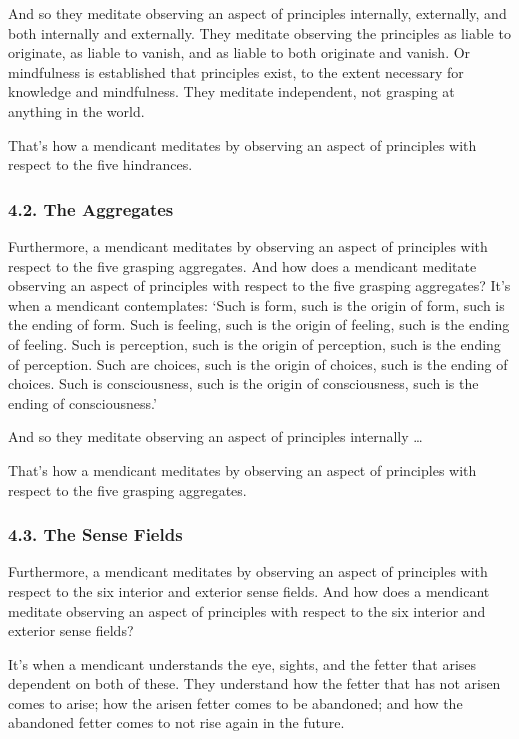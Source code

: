 \documentclass[12pt,openany]{book}%
\begin{document}
And so they meditate observing an aspect of principles internally, externally, and both internally and externally. They meditate observing the principles as liable to originate, as liable to vanish, and as liable to both originate and vanish. Or mindfulness is established that principles exist, to the extent necessary for knowledge and mindfulness. They meditate independent, not grasping at anything in the world. 

That’s how a mendicant meditates by observing an aspect of principles with respect to the five hindrances. 

\subsubsection*{4.2. The Aggregates }

Furthermore, a mendicant meditates by observing an aspect of principles with respect to the five grasping aggregates. And how does a mendicant meditate observing an aspect of principles with respect to the five grasping aggregates? It’s when a mendicant contemplates: ‘Such is form, such is the origin of form, such is the ending of form. Such is feeling, such is the origin of feeling, such is the ending of feeling. Such is perception, such is the origin of perception, such is the ending of perception. Such are choices, such is the origin of choices, such is the ending of choices. Such is consciousness, such is the origin of consciousness, such is the ending of consciousness.’ 

And so they meditate observing an aspect of principles internally … 

That’s how a mendicant meditates by observing an aspect of principles with respect to the five grasping aggregates. 

\subsubsection*{4.3. The Sense Fields }

Furthermore, a mendicant meditates by observing an aspect of principles with respect to the six interior and exterior sense fields. And how does a mendicant meditate observing an aspect of principles with respect to the six interior and exterior sense fields? 

It’s when a mendicant understands the eye, sights, and the fetter that arises dependent on both of these. They understand how the fetter that has not arisen comes to arise; how the arisen fetter comes to be abandoned; and how the abandoned fetter comes to not rise again in the future. 
\end{document}
